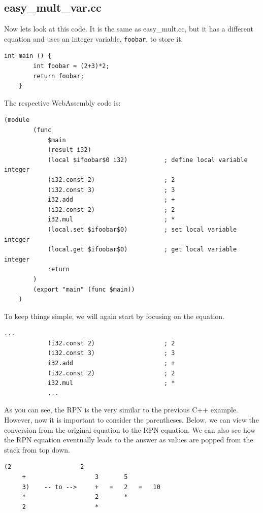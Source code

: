 \documentclass{article}
\theoremstyle{theorem}
\theoremstyle{definition}
\theoremstyle{remark}
\begin{document}
\subsection{easy\_mult\_var.cc}
\medskip\noindent
Now lets look at this code. It is the same as easy\_mult.cc, but it has a different equation and uses an integer variable, \verb|foobar|, to store it.

\medskip\noindent
\begin{lstlisting}[style=CStyle]
    int main () {
        int foobar = (2+3)*2;
        return foobar;
    }
\end{lstlisting}

\medskip\noindent
The respective WebAssembly code is:

\medskip\noindent
\begin{lstlisting}[style=WasmStyle]
    (module
        (func
            $main
            (result i32)
            (local $ifoobar$0 i32)          ; define local variable integer
            (i32.const 2)                   ; 2
            (i32.const 3)                   ; 3
            i32.add                         ; +
            (i32.const 2)                   ; 2
            i32.mul                         ; *
            (local.set $ifoobar$0)          ; set local variable integer
            (local.get $ifoobar$0)          ; get local variable integer
            return
        )
        (export "main" (func $main))
    )
\end{lstlisting}

\medskip\noindent
To keep things simple, we will again start by focusing on the equation.

\medskip\noindent
\begin{lstlisting}[style=WasmStyle]
            ...
            (i32.const 2)                   ; 2
            (i32.const 3)                   ; 3
            i32.add                         ; +
            (i32.const 2)                   ; 2
            i32.mul                         ; *
            ...
\end{lstlisting}

\medskip\noindent
As you can see, the RPN is the very similar to the previous C++ example. However, now it is important to consider the parentheses. Below, we can view the conversion from the original equation to the RPN equation. We can also see how the RPN equation eventually leads to the answer as values are popped from the stack from top down.

\medskip\noindent
\begin{lstlisting}[style=CStyle]
    (2                   2
     +                   3       5
     3)    -- to -->     +   =   2   =   10
     *                   2       *
     2                   *
\end{lstlisting}
\end{document}

